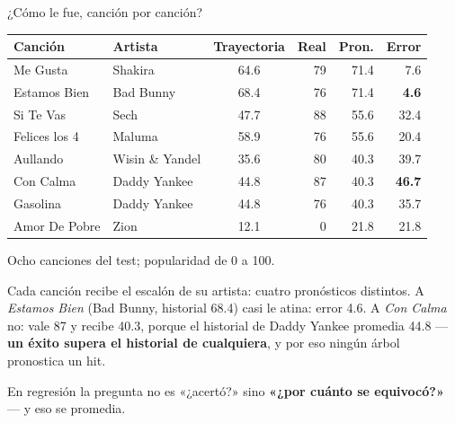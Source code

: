 \documentclass{beamer}
\begin{document}
\begin{frame}{¿Cómo le fue, canción por canción?}
\small
\begin{center}
\footnotesize
\setlength{\tabcolsep}{4pt}
\begin{tabular}{@{}l l c r r r@{}}
\toprule
\textbf{Canción} & \textbf{Artista} & \textbf{Trayectoria} & \textbf{Real} & \textbf{Pron.} & \textbf{Error} \\
\midrule
Me Gusta & Shakira & 64.6 & 79 & 71.4 & 7.6 \\
\rowcolor{grisclaro} Estamos Bien & Bad Bunny & 68.4 & 76 & 71.4 & \textbf{4.6} \\
Si Te Vas & Sech & 47.7 & 88 & 55.6 & 32.4 \\
Felices los 4 & Maluma & 58.9 & 76 & 55.6 & 20.4 \\
Aullando & Wisin \& Yandel & 35.6 & 80 & 40.3 & 39.7 \\
\rowcolor{grisclaro} Con Calma & Daddy Yankee & 44.8 & 87 & 40.3 & \textbf{46.7} \\
Gasolina & Daddy Yankee & 44.8 & 76 & 40.3 & 35.7 \\
Amor De Pobre & Zion & 12.1 & 0 & 21.8 & 21.8 \\
\bottomrule
\end{tabular}

\vspace{0.05cm}
\tiny Ocho canciones del test; popularidad de 0 a 100.
\end{center}

\vspace{0.15cm}
Cada canción recibe el escalón de su artista: cuatro pronósticos distintos. A \textit{Estamos Bien} (Bad Bunny, historial 68.4) casi le atina: error 4.6. A \textit{Con Calma} no: vale 87 y recibe 40.3, porque el historial de Daddy Yankee promedia 44.8 --- \textbf{un éxito supera el historial de cualquiera}, y por eso ningún árbol pronostica un hit.

\vspace{0.1cm}
En regresión la pregunta no es «¿acertó?» sino \textbf{«¿por cuánto se equivocó?»} --- y eso se promedia.
\end{frame}
\end{document}

